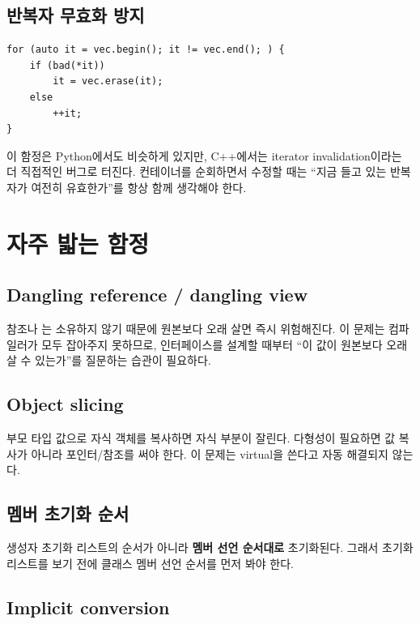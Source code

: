 \documentclass[11pt,a4paper]{book}
\DeclareRobustCommand{\code}[1]{\texttt{\detokenize{#1}}}
\newcommand{\term}[1]{\textbf{#1}}
\begin{document}
\section{반복자 무효화 방지}

\begin{lstlisting}[style=cpp,title={erase가 다음 반복자를 반환한다}]
for (auto it = vec.begin(); it != vec.end(); ) {
    if (bad(*it))
        it = vec.erase(it);
    else
        ++it;
}
\end{lstlisting}

이 함정은 Python에서도 비슷하게 있지만, C++에서는 iterator invalidation이라는 더 직접적인 버그로 터진다. 컨테이너를 순회하면서 수정할 때는 ``지금 들고 있는 반복자가 여전히 유효한가''를 항상 함께 생각해야 한다.

\chapter{자주 밟는 함정}

\section{Dangling reference / dangling view}

참조나 \code{string_view}는 소유하지 않기 때문에 원본보다 오래 살면 즉시 위험해진다. 이 문제는 컴파일러가 모두 잡아주지 못하므로, 인터페이스를 설계할 때부터 ``이 값이 원본보다 오래 살 수 있는가''를 질문하는 습관이 필요하다.

\section{Object slicing}

부모 타입 값으로 자식 객체를 복사하면 자식 부분이 잘린다. 다형성이 필요하면 값 복사가 아니라 포인터/참조를 써야 한다. 이 문제는 virtual을 쓴다고 자동 해결되지 않는다.

\section{멤버 초기화 순서}

생성자 초기화 리스트의 순서가 아니라 \term{멤버 선언 순서대로} 초기화된다. 그래서 초기화 리스트를 보기 전에 클래스 멤버 선언 순서를 먼저 봐야 한다.

\section{Implicit conversion}
\end{document}

